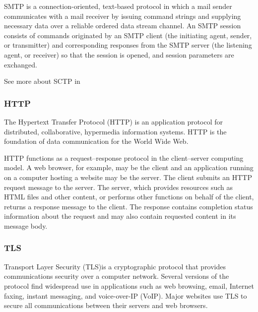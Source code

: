SMTP is a connection-oriented, text-based protocol in which a mail sender communicates with a mail receiver by issuing command strings and supplying necessary data over a reliable ordered data stream channel. An SMTP session consists of commands originated by an SMTP client (the initiating agent, sender, or transmitter) and corresponding responses from the SMTP server (the listening agent, or receiver) so that the session is opened, and session parameters are exchanged.

See more about SCTP in \cite{SMTP}

\subsubsection{HTTP}
The Hypertext Transfer Protocol (HTTP) is an application protocol for distributed, collaborative, hypermedia information systems. HTTP is the foundation of data communication for the World Wide Web.

HTTP functions as a request–response protocol in the client–server computing model. A web browser, for example, may be the client and an application running on a computer hosting a website may be the server. The client submits an HTTP request message to the server. The server, which provides resources such as HTML files and other content, or performs other functions on behalf of the client, returns a response message to the client. The response contains completion status information about the request and may also contain requested content in its message body.

\subsubsection{TLS}
Transport Layer Security (TLS)is a cryptographic protocol that provides communications security over a computer network. Several versions of the protocol find widespread use in applications such as web browsing, email, Internet faxing, instant messaging, and voice-over-IP (VoIP). Major websites use TLS to secure all communications between their servers and web browsers.

